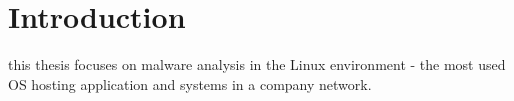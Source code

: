 \chapter{Introduction}

this thesis focuses on malware analysis in the Linux environment - the most used OS hosting application and systems in a company network.